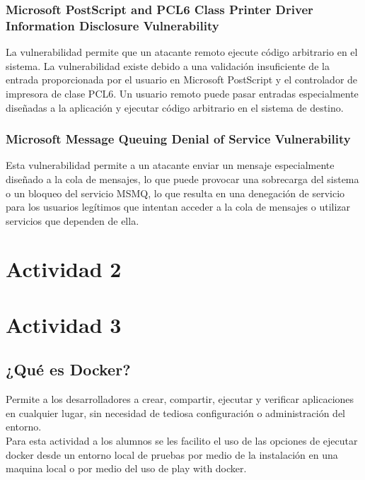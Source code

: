 \documentclass[stu, 11pt, letterpaper, donotrepeattitle, floatsintext, natbib]{apa7}
\begin{document}
\subsubsection{Microsoft PostScript and PCL6 Class Printer Driver Information Disclosure Vulnerability}

La vulnerabilidad permite que un atacante remoto ejecute código arbitrario en el sistema. La vulnerabilidad existe debido a una validación insuficiente de la entrada proporcionada por el usuario en Microsoft PostScript y el controlador de impresora de clase PCL6. Un usuario remoto puede pasar entradas especialmente diseñadas a la aplicación y ejecutar código arbitrario en el sistema de destino.

\subsubsection{Microsoft Message Queuing Denial of Service Vulnerability}

Esta vulnerabilidad permite a un atacante enviar un mensaje especialmente diseñado a la cola de mensajes, lo que puede provocar una sobrecarga del sistema o un bloqueo del servicio MSMQ, lo que resulta en una denegación de servicio para los usuarios legítimos que intentan acceder a la cola de mensajes o utilizar servicios que dependen de ella.

\newpage

\section{\large Actividad 2}

\newpage

\section{\large Actividad 3}

\subsection{¿Qué es Docker?} 
Permite a los desarrolladores a crear, compartir, ejecutar y verificar aplicaciones en cualquier lugar, sin necesidad de tediosa configuración o administración del entorno. 
\noindent {}\\

Para esta actividad a los alumnos se les facilito el uso de las opciones de ejecutar docker desde un entorno local de pruebas por medio de la instalación en una maquina local o por medio del uso de play with docker.
\end{document}
